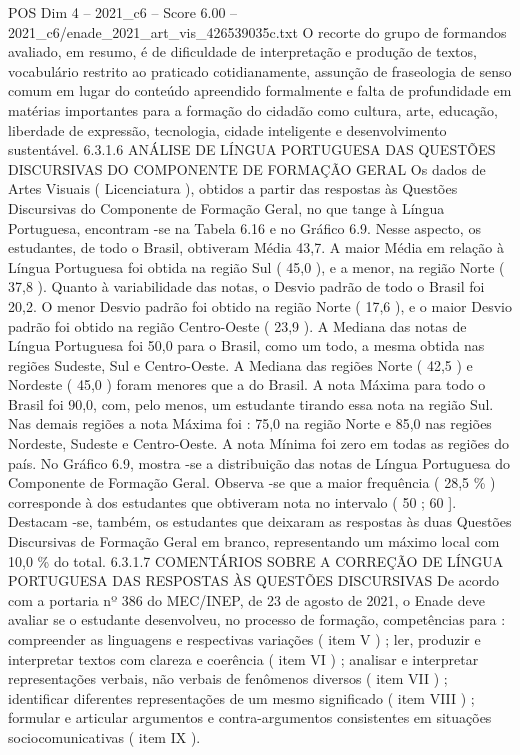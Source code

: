 \begin{textsample}{POS Dim 4 – 2021\_c6 – Score 6.00 – 2021\_c6/enade\_2021\_art\_vis\_426539035c.txt}
O recorte do grupo de formandos avaliado, em resumo, é de dificuldade de interpretação e produção de textos, vocabulário restrito ao praticado cotidianamente, assunção de fraseologia de senso comum em lugar do conteúdo apreendido formalmente e falta de profundidade em matérias importantes para a formação do cidadão como cultura, arte, educação, liberdade de expressão, tecnologia, cidade inteligente e desenvolvimento sustentável. 6.3.1.6 ANÁLISE DE LÍNGUA PORTUGUESA DAS QUESTÕES DISCURSIVAS DO COMPONENTE DE FORMAÇÃO GERAL Os dados de Artes Visuais ( Licenciatura ), obtidos a partir das respostas às Questões Discursivas do Componente de Formação Geral, no que tange à Língua Portuguesa, encontram -se na Tabela 6.16 e no Gráfico 6.9.
Nesse aspecto, os estudantes, de todo o Brasil, obtiveram Média 43,7.
A maior Média em relação à Língua Portuguesa foi obtida na região Sul ( 45,0 ), e a menor, na região Norte ( 37,8 ).
Quanto à variabilidade das notas, o Desvio padrão de todo o Brasil foi 20,2.
O menor Desvio padrão foi obtido na região Norte ( 17,6 ), e o maior Desvio padrão foi obtido na região Centro-Oeste ( 23,9 ).
A Mediana das notas de Língua Portuguesa foi 50,0 para o Brasil, como um todo, a mesma obtida nas regiões Sudeste, Sul e Centro-Oeste.
A Mediana das regiões Norte ( 42,5 ) e Nordeste ( 45,0 ) foram menores que a do Brasil.
A nota Máxima para todo o Brasil foi 90,0, com, pelo menos, um estudante tirando essa nota na região Sul.
Nas demais regiões a nota Máxima foi : 75,0 na região Norte e 85,0 nas regiões Nordeste, Sudeste e Centro-Oeste.
A nota Mínima foi zero em todas as regiões do país.
No Gráfico 6.9, mostra -se a distribuição das notas de Língua Portuguesa do Componente de Formação Geral.
Observa -se que a maior frequência ( 28,5 \% ) corresponde à dos estudantes que obtiveram nota no intervalo ( 50 ; 60 ].
Destacam -se, também, os estudantes que deixaram as respostas às duas Questões Discursivas de Formação Geral em branco, representando um máximo local com 10,0 \% do total. 6.3.1.7 COMENTÁRIOS SOBRE A CORREÇÃO DE LÍNGUA PORTUGUESA DAS RESPOSTAS ÀS QUESTÕES DISCURSIVAS De acordo com a portaria nº 386 do MEC/INEP, de 23 de agosto de 2021, o Enade deve avaliar se o estudante desenvolveu, no processo de formação, competências para : compreender as linguagens e respectivas variações ( item V ) ; ler, produzir e interpretar textos com clareza e coerência ( item VI ) ; analisar e interpretar representações verbais, não verbais de fenômenos diversos ( item VII ) ; identificar diferentes representações de um mesmo significado ( item VIII ) ; formular e articular argumentos e contra-argumentos consistentes em situações sociocomunicativas ( item IX ).

\end{textsample}
